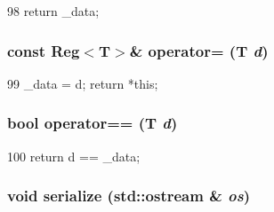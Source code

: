 \begin{DoxyCode}
98 { return _data; }
\end{DoxyCode}
\hypertarget{structCopyEngineReg_1_1Reg_ae79c18c14f560a6d39b4111ac120b702}{
\subsubsection[{operator=}]{\setlength{\rightskip}{0pt plus 5cm}const {\bf Reg}$<$T$>$\& operator= (T {\em d})}}
\label{structCopyEngineReg_1_1Reg_ae79c18c14f560a6d39b4111ac120b702}



\begin{DoxyCode}
99 { _data = d; return *this;}
\end{DoxyCode}
\hypertarget{structCopyEngineReg_1_1Reg_a784db2d8753913b11cdf46eae9c2e6a5}{
\subsubsection[{operator==}]{\setlength{\rightskip}{0pt plus 5cm}bool operator== (T {\em d})}}
\label{structCopyEngineReg_1_1Reg_a784db2d8753913b11cdf46eae9c2e6a5}



\begin{DoxyCode}
100 { return d == _data; }
\end{DoxyCode}
\hypertarget{structCopyEngineReg_1_1Reg_a53e036786d17361be4c7320d39c99b84}{
\subsubsection[{serialize}]{\setlength{\rightskip}{0pt plus 5cm}void serialize (std::ostream \& {\em os})}}
\label{structCopyEngineReg_1_1Reg_a53e036786d17361be4c7320d39c99b84}



